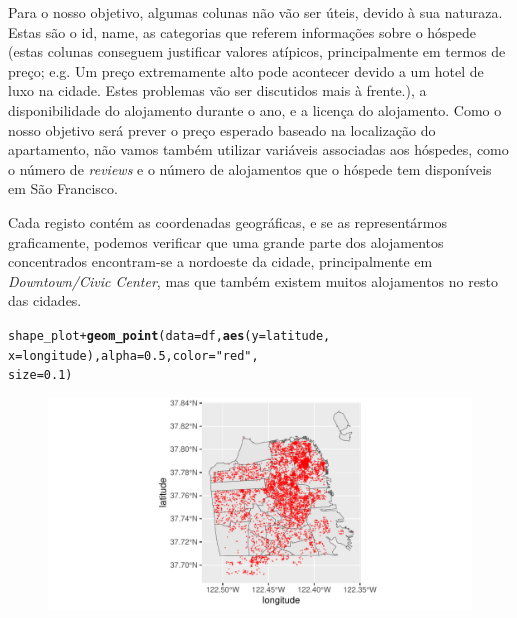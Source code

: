 \documentclass[justified, 11pt]{scrartcl}\usepackage[]{graphicx}\usepackage[]{xcolor}
\makeatletter
\def\maxwidth{ %
  \ifdim\Gin@nat@width>\linewidth
    \linewidth
  \else
    \Gin@nat@width
  \fi
}
\newcommand{\hlnum}[1]{\textcolor[rgb]{0.686,0.059,0.569}{#1}}%
\newcommand{\hlstr}[1]{\textcolor[rgb]{0.192,0.494,0.8}{#1}}%
\newcommand{\hlopt}[1]{\textcolor[rgb]{0,0,0}{#1}}%
\newcommand{\hlstd}[1]{\textcolor[rgb]{0.345,0.345,0.345}{#1}}%
\newcommand{\hlkwc}[1]{\textcolor[rgb]{0.333,0.667,0.333}{#1}}%
\newcommand{\hlkwd}[1]{\textcolor[rgb]{0.737,0.353,0.396}{\textbf{#1}}}%
\newenvironment{kframe}{%
 \def\at@end@of@kframe{}%
 \ifinner\ifhmode%
  \def\at@end@of@kframe{\end{minipage}}%
  \begin{minipage}{\columnwidth}%
 \fi\fi%
 \def\FrameCommand##1{\hskip\@totalleftmargin \hskip-\fboxsep
 \colorbox{shadecolor}{##1}\hskip-\fboxsep
     \hskip-\linewidth \hskip-\@totalleftmargin \hskip\columnwidth}%
 \MakeFramed {\advance\hsize-\width
   \@totalleftmargin\z@ \linewidth\hsize
   \@setminipage}}%
 {\par\unskip\endMakeFramed%
 \at@end@of@kframe}
\newenvironment{knitrout}{}{} %
\makeatother
\begin{document}
Para o nosso objetivo, algumas colunas não vão ser úteis, devido à sua naturaza. Estas são o id, name, as categorias que referem informações sobre o hóspede (estas colunas conseguem justificar valores atípicos, principalmente em termos de preço; e.g. Um preço extremamente alto pode acontecer devido a um hotel de luxo na cidade. Estes problemas vão ser discutidos mais à frente.), a disponibilidade do alojamento durante o ano, e a licença do alojamento. Como o nosso objetivo será prever o preço esperado baseado na localização do apartamento, não vamos também utilizar variáveis associadas aos hóspedes, como o número de \textit{reviews} e o número de alojamentos que o hóspede tem disponíveis em São Francisco.

Cada registo contém as coordenadas geográficas, e se as representármos graficamente, podemos verificar que uma grande parte dos alojamentos concentrados encontram-se a nordoeste da cidade, principalmente em \textit{Downtown/Civic Center}, mas que também existem muitos alojamentos no resto das cidades.
\begin{knitrout}
\color{fgcolor}\begin{kframe}
\begin{alltt}
\hlstd{shape_plot} \hlopt{+} \hlkwd{geom_point}\hlstd{(}\hlkwc{data} \hlstd{= df,} \hlkwd{aes}\hlstd{(}\hlkwc{y} \hlstd{= latitude,}
    \hlkwc{x} \hlstd{= longitude),} \hlkwc{alpha} \hlstd{=} \hlnum{0.5}\hlstd{,} \hlkwc{color} \hlstd{=} \hlstr{"red"}\hlstd{,}
    \hlkwc{size} \hlstd{=} \hlnum{0.1}\hlstd{)}
\end{alltt}
\end{kframe}\begin{figure}
\includegraphics[width=\maxwidth]{figure/chunk-plotPlace-1} \end{figure}

\end{knitrout}
\end{document}
